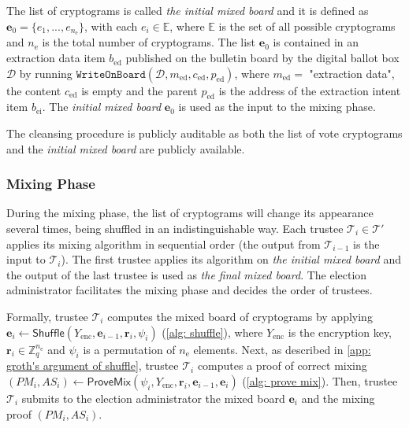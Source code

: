 The list of cryptograms is called \textit{the initial mixed board} and it is defined as $\boldsymbol{e}_0 = \{ e_1, ..., e_{n_\mathrm{e}} \}$, with each $e_i \in \mathbb{E}$, where $\mathbb{E}$ is the set of all possible cryptograms and $n_\mathrm{e}$ is the total number of cryptograms. The list $\boldsymbol{e}_0$ is contained in an extraction data item $b_\mathrm{ed}$ published on the bulletin board by the digital ballot box $\mathcal{D}$ by running $\mathtt{WriteOnBoard}(\mathcal{D}, m_\mathrm{ed}, c_\mathrm{ed}, p_\mathrm{ed})$, where $m_\mathrm{ed} = $ "extraction data", the content $c_\mathrm{ed}$ is empty and the parent $p_\mathrm{ed}$ is the address of the extraction intent item $b_\mathrm{ei}$. The \textit{initial mixed board} $\boldsymbol{e}_0$ is used as the input to the mixing phase.

The cleansing procedure is publicly auditable as both the list of vote cryptograms and the \textit{initial mixed board} are publicly available.


\subsubsection{Mixing Phase} \label{sec: mixing phase}
During the mixing phase, the list of cryptograms will change its appearance several times, being shuffled in an indistinguishable way. Each trustee \( \mathcal{T}_i \in \boldsymbol{\mathcal{T}'} \) applies its mixing algorithm in sequential order (the output from $\mathcal{T}_{i-1}$ is the input to $\mathcal{T}_i$). The first trustee applies its algorithm on \textit{the initial mixed board} and the output of the last trustee is used as \textit{the final mixed board}. The election administrator facilitates the mixing phase and decides the order of trustees.

Formally, trustee $\mathcal{T}_i$ computes the mixed board of cryptograms by applying $\boldsymbol{e}_i \gets \mathsf{Shuffle}(Y_\mathrm{enc}, \boldsymbol{e}_{i-1}, \boldsymbol{r}_i, \psi_i)$ (\cref{alg: shuffle}), where $Y_\mathrm{enc}$ is the encryption key, $\boldsymbol{r}_i \in \mathbb{Z}_q^{n_\mathrm{e}}$ and $\psi_i$ is a permutation of $n_\mathrm{e}$ elements. Next, as described in \cref{app: groth's argument of shuffle}, trustee $\mathcal{T}_i$ computes a proof of correct mixing $(PM_i, AS_i) \gets \mathsf{ProveMix}(\psi_i, Y_\mathrm{enc}, \boldsymbol{r}_i, \boldsymbol{e}_{i-1}, \boldsymbol{e}_i)$ (\cref{alg: prove mix}). Then, trustee $\mathcal{T}_i$ submits to the election administrator the mixed board $\boldsymbol{e}_i$ and the mixing proof $(PM_i, AS_i)$.

